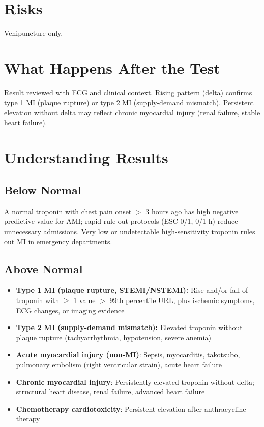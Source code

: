 \section*{Risks}
Venipuncture only.

\section*{What Happens After the Test}
Result reviewed with ECG and clinical context. Rising pattern (delta) confirms type 1 MI (plaque rupture) or type 2 MI (supply-demand mismatch). Persistent elevation without delta may reflect chronic myocardial injury (renal failure, stable heart failure).

\section*{Understanding Results}

\subsection*{Below Normal}
A normal troponin with chest pain onset $>$ 3 hours ago has high negative predictive value for AMI; rapid rule-out protocols (ESC 0/1, 0/1-h) reduce unnecessary admissions. Very low or undetectable high-sensitivity troponin rules out MI in emergency departments.

\subsection*{Above Normal}
\begin{itemize}
  \item \textbf{Type 1 MI (plaque rupture, STEMI/NSTEMI):} Rise and/or fall of troponin with $\geq$ 1 value $>$ 99th percentile URL, plus ischemic symptoms, ECG changes, or imaging evidence
  \item \textbf{Type 2 MI (supply-demand mismatch):} Elevated troponin without plaque rupture (tachyarrhythmia, hypotension, severe anemia)
  \item \textbf{Acute myocardial injury (non-MI)}: Sepsis, myocarditis, takotsubo, pulmonary embolism (right ventricular strain), acute heart failure
  \item \textbf{Chronic myocardial injury}: Persistently elevated troponin without delta; structural heart disease, renal failure, advanced heart failure
  \item \textbf{Chemotherapy cardiotoxicity}: Persistent elevation after anthracycline therapy
\end{itemize}

